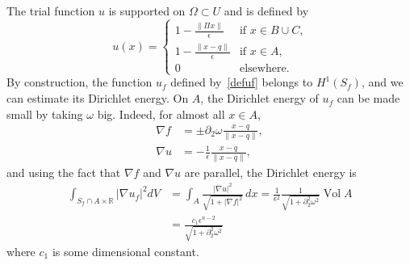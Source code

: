 \documentclass{GEM-JNL-FMP}
\theoremstyle{definition}
\numberwithin{equation}{section}
\begin{document}
The trial function $u$ is supported on $\Omega\subset U$
and is defined by
\begin{equation}
  u(x) =
  \begin{cases}
    1 - \frac{\|\Pi x\|}{\epsilon} &\text{if $x \in B \cup C$,} \\
    1 - \frac{\|x - q\|}{\epsilon} &\text{if $x \in A$,}\\
    0 &\text{elsewhere}.
  \end{cases}
\end{equation}
By construction, the function $u_f$ defined by~\eqref{defuf} belongs to $H^1(S_f)$, and we can estimate its Dirichlet energy.
On $A$, the Dirichlet energy of $u_f$ can be made small by taking
$\omega$ big. Indeed, for almost all $x \in A$,
\begin{align}\label{eq:nablafonA}
  \nabla f &=
  \pm \partial_2 \omega \frac{x - q}{\|x - q\|}
  ,
  \\
  \nabla u &= -
  \frac{1}{\epsilon}\frac{x - q}{\|x - q\|}
  ,
\end{align}
and using the fact that $\nabla f$ and $\nabla u$ are parallel,
the Dirichlet energy is
\begin{align*}
  \int_{S_f \cap A \times \mathbb{R}} |\nabla u_f|^2 dV
  &= \int_A \frac{|\nabla u|^2}{\sqrt{1 + |\nabla f|^2}}\,dx
  = \frac{1}{\epsilon^2}
  \frac{1}{\sqrt{1 + \partial_2^2 \omega^2}} \mathop{\mbox{Vol}} A\\
  &= \frac{c_1 \epsilon^{n-2}}{\sqrt{1 + \partial_2^2 \omega^2}}
\end{align*}
where $c_1$ is some dimensional constant.
\end{document}
